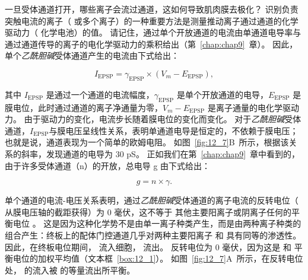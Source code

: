 一旦受体通道打开，哪些离子会流过通道，这如何导致肌肉膜去极化？
识别负责突触电流的离子（ 或多个离子）的一种重要方法是测量推动离子通过通道的化学驱动力（ 化学电池）的值。
请记住，通过单个开放通道的电流由单通道电导率与通过通道传导的离子的电化学驱动力的乘积给出（第~\ref{chap:chap9}~章）。 
因此，单个\textit{乙酰胆碱}受体通道产生的电流由下式给出：


\begin{equation}
	I_{\text{EPSP}} = \gamma_{\text{EPSP}}\times (V_m - E_{\text{EPSP}}),
\end{equation}


其中 $I_{\text{EPSP}}$ 是通过一个通道的电流幅度，$\gamma_{\text{EPSP}}$ 是单个开放通道的电导，$ E_{\text{EPSP}} $ 是膜电位，此时通过通道的离子净通量为零，$V_m - E_{\text{EPSP}}$ 是离子通量的电化学驱动力。
由于驱动力的变化，电流步长随着膜电位的变化而变化。 
对于\textit{乙酰胆碱}受体通道，$I_{\text{EPSP}}$与膜电压呈线性关系，表明单通道电导是恒定的，不依赖于膜电压；
也就是说，通道表现为一个简单的欧姆电阻。
如图~\ref{fig:12_7}B~所示，根据该关系的斜率，发现通道的电导为 30 pS。
正如我们在第~\ref{chap:chap9}~章中看到的，由于许多受体通道（n）的开放，总电导 g 由下式给出：


\begin{equation}
	g = n \times \gamma.
\end{equation}


单个通道的电流-电压关系表明，通过\textit{乙酰胆碱}受体通道的离子电流的反转电位（ 从膜电压轴的截距获得）为 0 毫伏，这不等于  其他主要阳离子或阴离子任何的平衡电位 。
这是因为这种化学势不是由单一离子种类产生，而是由两种离子种类的组合产生：终板上的配体门控通道几乎对两种主要阳离子  和  具有同等的渗透性。
因此，在终板电位期间， 流入细胞， 流出。
反转电位为 0 毫伏，因为这是  和  平衡电位的加权平均值（文本框~\ref{box:12_1}）。
如图~\ref{fig:12_7}A~所示，在反转电位处， 的流入被  的等量流出所平衡。


